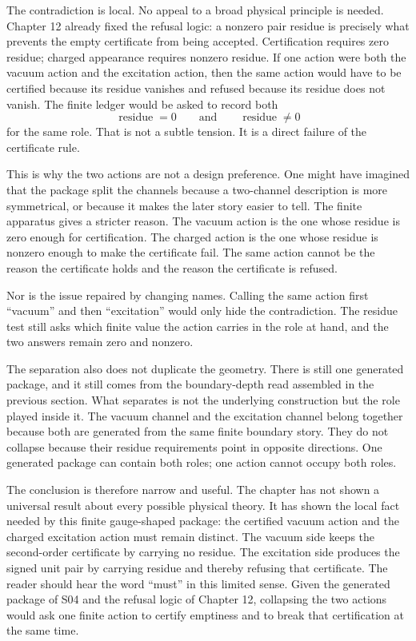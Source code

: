 The contradiction is local. No appeal to a broad physical principle is needed.
Chapter 12 already fixed the refusal logic: a nonzero pair residue is precisely
what prevents the empty certificate from being accepted. Certification requires
zero residue; charged appearance requires nonzero residue. If one action were
both the vacuum action and the excitation action, then the same action would have
to be certified because its residue vanishes and refused because its residue does
not vanish. The finite ledger would be asked to record both
\[
  \operatorname{residue}=0
  \qquad\text{and}\qquad
  \operatorname{residue}\neq 0
\]
for the same role. That is not a subtle tension. It is a direct failure of the
certificate rule.

This is why the two actions are not a design preference. One might have imagined
that the package split the channels because a two-channel description is more
symmetrical, or because it makes the later story easier to tell. The finite
apparatus gives a stricter reason. The vacuum action is the one whose residue is
zero enough for certification. The charged action is the one whose residue is
nonzero enough to make the certificate fail. The same action cannot be the reason
the certificate holds and the reason the certificate is refused.

Nor is the issue repaired by changing names. Calling the same action first
``vacuum'' and then ``excitation'' would only hide the contradiction. The
residue test still asks which finite value the action carries in the role at
hand, and the two answers remain zero and nonzero.

The separation also does not duplicate the geometry. There is still one
generated package, and it still comes from the boundary-depth read assembled in
the previous section. What separates is not the underlying construction but the
role played inside it. The vacuum channel and the excitation channel belong
together because both are generated from the same finite boundary story. They do
not collapse because their residue requirements point in opposite directions.
One generated package can contain both roles; one action cannot occupy both
roles.

The conclusion is therefore narrow and useful. The chapter has not shown a
universal result about every possible physical theory. It has shown the local
fact needed by this finite gauge-shaped package: the certified vacuum action and
the charged excitation action must remain distinct. The vacuum side keeps the
second-order certificate by carrying no residue. The excitation side produces the
signed unit pair by carrying residue and thereby refusing that certificate. The
reader should hear the word ``must'' in this limited sense. Given the generated
package of S04 and the refusal logic of Chapter 12, collapsing the two actions
would ask one finite action to certify emptiness and to break that certification
at the same time.

